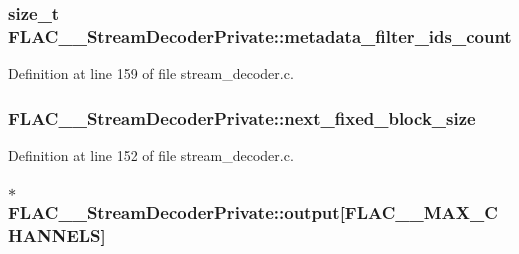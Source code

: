 \subsubsection[{\texorpdfstring{metadata\+\_\+filter\+\_\+ids\+\_\+count}{metadata_filter_ids_count}}]{\setlength{\rightskip}{0pt plus 5cm}size\+\_\+t F\+L\+A\+C\+\_\+\+\_\+\+Stream\+Decoder\+Private\+::metadata\+\_\+filter\+\_\+ids\+\_\+count}\hypertarget{struct_f_l_a_c_____stream_decoder_private_a4c0d3dcc57cdbccc06c3e98c4aa4d547}{}\label{struct_f_l_a_c_____stream_decoder_private_a4c0d3dcc57cdbccc06c3e98c4aa4d547}


Definition at line 159 of file stream\+\_\+decoder.\+c.

\subsubsection[{\texorpdfstring{next\+\_\+fixed\+\_\+block\+\_\+size}{next_fixed_block_size}}]{ F\+L\+A\+C\+\_\+\+\_\+\+Stream\+Decoder\+Private\+::next\+\_\+fixed\+\_\+block\+\_\+size}\hypertarget{struct_f_l_a_c_____stream_decoder_private_aa302e5dc4d2235d31b36456559215187}{}\label{struct_f_l_a_c_____stream_decoder_private_aa302e5dc4d2235d31b36456559215187}


Definition at line 152 of file stream\+\_\+decoder.\+c.

\subsubsection[{\texorpdfstring{output}{output}}]{$\ast$ F\+L\+A\+C\+\_\+\+\_\+\+Stream\+Decoder\+Private\+::output\mbox{[}{\bf F\+L\+A\+C\+\_\+\+\_\+\+M\+A\+X\+\_\+\+C\+H\+A\+N\+N\+E\+LS}\mbox{]}}\hypertarget{struct_f_l_a_c_____stream_decoder_private_a20c94be829f55532d695eb83e94c8cb2}{}\label{struct_f_l_a_c_____stream_decoder_private_a20c94be829f55532d695eb83e94c8cb2}


